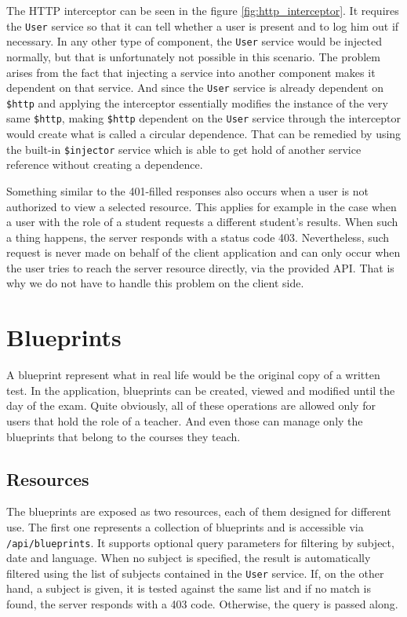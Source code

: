 \documentclass[thesis=M,english,hidelinks]{FITthesis}[2012/10/20]
\newcommand{\code}{\texttt}
\begin{document}
The HTTP interceptor can be seen in the figure \ref{fig:http_interceptor}. It requires the \code{User} service so that it can tell whether a user is present and to log him out if necessary. In any other type of component, the \code{User} service would be injected normally, but that is unfortunately not possible in this scenario. The problem arises from the fact that injecting a service into another component makes it dependent on that service. And since the \code{User} service is already dependent on \code{\$http} and applying the interceptor essentially modifies the instance of the very same \code{\$http}, making \code{\$http} dependent on the \code{User} service through the interceptor would create what is called a circular dependence. That can be remedied by using the built-in \code{\$injector} service which is able to get hold of another service reference without creating a dependence.

Something similar to the 401-filled responses also occurs when a user is not authorized to view a selected resource. This applies for example in the case when a user with the role of a student requests a different student's results. When such a thing happens, the server responds with a status code 403. Nevertheless, such request is never made on behalf of the client application and can only occur when the user tries to reach the server resource directly, via the provided API. That is why we do not have to handle this problem on the client side.

  \section{Blueprints}

A blueprint represent what in real life would be the original copy of a written test. In the application, blueprints can be created, viewed and modified until the day of the exam. Quite obviously, all of these operations are allowed only for users that hold the role of a teacher. And even those can manage only the blueprints that belong to the courses they teach.

    \subsection{Resources}

The blueprints are exposed as two resources, each of them designed for different use. The first one represents a collection of blueprints and is accessible via \code{/api/blueprints}. It supports optional query parameters for filtering by subject, date and language. When no subject is specified, the result is automatically filtered using the list of subjects contained in the \code{User} service. If, on the other hand, a subject is given, it is tested against the same list and if no match is found, the server responds with a 403 code. Otherwise, the query is passed along.
\end{document}
